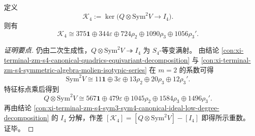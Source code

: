 \begin{conclusion}[四次层二次系数核表示的闭式分解]\label{con:xi-terminal-zm-s4-quadratic-coefficient-kernel-degree4-closed-decomposition}
定义
\[
\mathcal K_4:=\ker\!\bigl(Q\otimes \mathrm{Sym}^2V\to I_4\bigr).
\]
则有
\[
\mathcal K_4
\cong
375\mathbf 1\oplus 344\varepsilon\oplus 724\rho_2\oplus 1090\rho_3\oplus 1056\rho_3'.
\]
\end{conclusion}
\begin{proof}[证明要点]
仍由二次生成性，\(Q\otimes \mathrm{Sym}^2V\twoheadrightarrow I_4\) 为 \(S_4\)-等变满射。
由结论 \ref{con:xi-terminal-zm-s4-canonical-quadrics-equivariant-decomposition} 与
\ref{con:xi-terminal-zm-s4-symmetric-algebra-molien-isotypic-series} 在 \(m=2\) 的系数可得
\[
\mathrm{Sym}^2V
\cong
11\mathbf 1\oplus 3\varepsilon\oplus 13\rho_2\oplus 20\rho_3\oplus 12\rho_3'.
\]
特征标点乘后得到
\[
Q\otimes \mathrm{Sym}^2V
\cong
567\mathbf 1\oplus 479\varepsilon\oplus 1045\rho_2\oplus 1584\rho_3\oplus 1496\rho_3'.
\]
再由结论 \ref{con:xi-terminal-zm-s4-sym3-sym4-canonical-ideal-low-degree-decomposition} 的 \(I_4\) 分解，作差
\(
[\mathcal K_4]=[Q\otimes \mathrm{Sym}^2V]-[I_4]
\)
即得所示重数。证毕。
\end{proof}

\endinput
